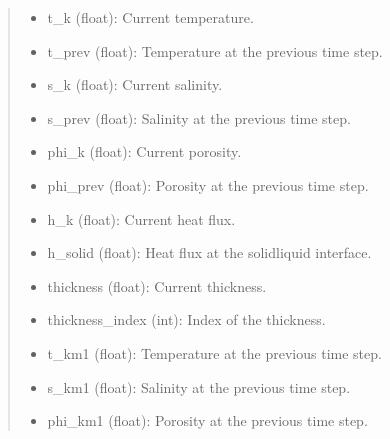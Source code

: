 \documentclass[a4paper,11pt,english,openany]{sphinxmanual}
\begin{document}
\begin{fulllineitems}
\begin{fulllineitems}
\begin{description}
\begin{itemize}
\end{itemize}

\end{description}
\begin{quote}\begin{description}
\sphinxAtStartPar
\begin{description}
\begin{itemize}
\item {} 
\sphinxAtStartPar
t\_k (float): Current temperature.

\item {} 
\sphinxAtStartPar
t\_prev (float): Temperature at the previous time step.

\item {} 
\sphinxAtStartPar
s\_k (float): Current salinity.

\item {} 
\sphinxAtStartPar
s\_prev (float): Salinity at the previous time step.

\item {} 
\sphinxAtStartPar
phi\_k (float): Current porosity.

\item {} 
\sphinxAtStartPar
phi\_prev (float): Porosity at the previous time step.

\item {} 
\sphinxAtStartPar
h\_k (float): Current heat flux.

\item {} 
\sphinxAtStartPar
h\_solid (float): Heat flux at the solid\sphinxhyphen{}liquid interface.

\item {} 
\sphinxAtStartPar
thickness (float): Current thickness.

\item {} 
\sphinxAtStartPar
thickness\_index (int): Index of the thickness.

\item {} 
\sphinxAtStartPar
t\_km1 (float): Temperature at the previous time step.

\item {} 
\sphinxAtStartPar
s\_km1 (float): Salinity at the previous time step.

\item {} 
\sphinxAtStartPar
phi\_km1 (float): Porosity at the previous time step.

\end{itemize}


\end{description}
\end{description}
\end{quote}
\end{fulllineitems}
\end{fulllineitems}
\end{document}
